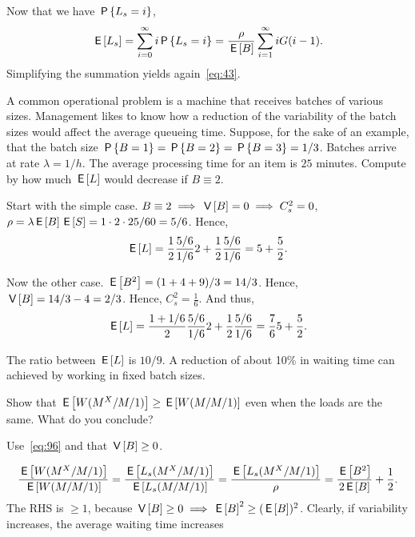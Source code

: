 Now that we have $\P{\Ls =i}$, 
\begin{equation*}
 \E{\Ls} = \sum_{i=0}^\infty i \P{\Ls=i} = \frac{\rho}{\E B} \sum_{i=1}^\infty i G(i-1).
\end{equation*}
Simplifying  the summation yields again~\cref{eq:43}.


\begin{exercise}\label{ex:64}
 A common operational problem is a machine that receives batches of
 various sizes. Management likes to know how a reduction of the
 variability of the batch sizes would affect the average queueing time.
 Suppose, for the sake of an example, that the batch size 
$\P{B=1} = \P{B=2} = \P{B=3} = 1/3$.
 Batches arrive at rate $\lambda = 1/h$.
 The average processing time for an item is $25$ minutes.
 Compute by how much  $\E\L$  would decrease if $B\equiv 2$.
\begin{solution}

 Start with the simple case.
 $B\equiv 2 \implies \V B=0 \implies C_s^2 = 0$,  $\rho=\lambda \E B \E S = 1\cdot 2 \cdot 25/60 = 5/6$. Hence,
 \begin{equation*}
 \E{\L} = \frac 12 \frac{5/6}{1/6} 2 + \frac 12 \frac{5/6}{1/6} = 5 + \frac52.
 \end{equation*}

Now the other case. $\E{B^2} = (1+4+9)/3 = 14/3$. Hence, $\V B=14/3 - 4=2/3$. Hence, 
$C_s^2= \frac 16$.
And thus, 
 \begin{equation*}
 \E{\L} = \frac {1+1/6}2 \frac{5/6}{1/6} 2 + \frac 12 \frac{5/6}{1/6} = \frac76 5 + \frac 52.
 \end{equation*}

 The ratio between $\E{\L}$ is $10/9$.
 A reduction of about 10\% in waiting time can achieved by working in fixed batch sizes.
\end{solution}
\end{exercise}

\begin{exercise}\label{ex:l-172}
 Show 
that $\E{\W(M^X/M/1)} \geq \E{\W(M/M/1)}$ even when the loads are the same.
 What do you conclude? 
\begin{hint}
Use~\cref{eq:96} and that $\V B \geq 0$.
\end{hint}
\begin{solution}
 \begin{equation*}
 \frac{\E{\W(M^X/M/1)}}{\E{\W(M/M/1)}} = \frac{\E{\Ls(M^X/M/1)}}{\E{\Ls(M/M/1)}} = \frac{\E{\Ls(M^X/M/1)}}{\rho} = 
\frac{\E{B^2}}{2\E B} + \frac 12.
 \end{equation*}
 The RHS is $\geq 1$, because $\V B \geq 0 \implies \E B^2 \geq (\E B)^2$.
 Clearly, if variability increases, the average waiting time increases
\end{solution}
\end{exercise}


